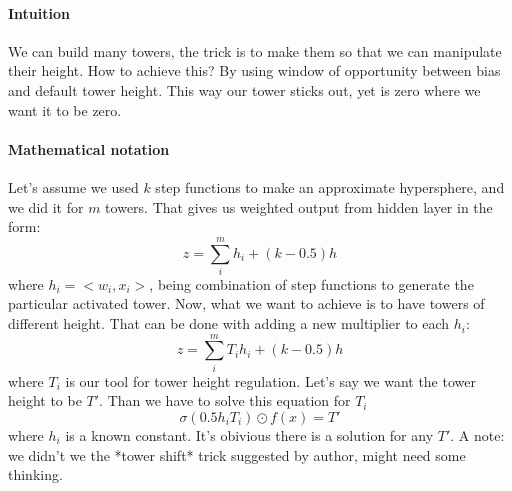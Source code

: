 \documentclass{article}
\begin{document}
\paragraph{Intuition}
We can build many towers, the trick is to make them so that we can manipulate their height.
How to achieve this? By using window of opportunity between bias and default tower height.
This way our tower sticks out, yet is zero where we want it to be zero.

\paragraph{Mathematical notation}
Let's assume we used $k$ step functions to make an approximate hypersphere, and we did it for $m$ towers.
That gives us weighted output from hidden layer in the form:
$$z = \sum_i^m h_i + (k-0.5)h$$
where $h_i = <w_i, x_i>$, being combination of step functions to generate the particular activated tower.
Now, what we want to achieve is to have towers of different height.
That can be done with adding a new multiplier to each $h_i$:
$$z = \sum_i^m T_i h_i + (k-0.5)h$$
where $T_i$ is our tool for tower height regulation. 
Let's say we want the tower height to be $T'$. Than we have to solve this equation for $T_i$
$$\sigma(0.5 h_i T_i) \odot f(x) = T'$$
where $h_i$ is a known constant. It's obivious there is a solution for any $T'$.
A note: we didn't we the *tower shift* trick suggested by author, might need some thinking.
\end{document}
